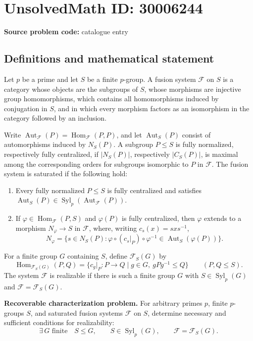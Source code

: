 \documentclass[11pt]{article}
\begin{document}
\section*{UnsolvedMath ID: 30006244}
\textbf{Source problem code:} catalogue entry
\subsection{Definitions and mathematical statement}
Let \(p\) be a prime and let \(S\) be a finite \(p\)-group. A fusion system \(\mathcal F\) on \(S\) is a category whose objects are the subgroups of \(S\), whose morphisms are injective group homomorphisms, which contains all homomorphisms induced by conjugation in \(S\), and in which every morphism factors as an isomorphism in the category followed by an inclusion.

Write \(\operatorname{Aut}_{\mathcal F}(P)=\operatorname{Hom}_{\mathcal F}(P,P)\), and let \(\operatorname{Aut}_S(P)\) consist of automorphisms induced by \(N_S(P)\). A subgroup \(P\leq S\) is fully normalized, respectively fully centralized, if \(|N_S(P)|\), respectively \(|C_S(P)|\), is maximal among the corresponding orders for subgroups isomorphic to \(P\) in \(\mathcal F\). The fusion system is saturated if the following hold:
\begin{enumerate}
\item Every fully normalized \(P\leq S\) is fully centralized and satisfies \(\operatorname{Aut}_S(P)\in\operatorname{Syl}_p(\operatorname{Aut}_{\mathcal F}(P))\).
\item If \(\varphi\in\operatorname{Hom}_{\mathcal F}(P,S)\) and \(\varphi(P)\) is fully centralized, then \(\varphi\) extends to a morphism \(N_\varphi\to S\) in \(\mathcal F\), where, writing \(c_s(x)=sxs^{-1}\),
\[
N_\varphi=\{s\in N_S(P):\varphi\circ(c_s|_P)\circ\varphi^{-1}\in\operatorname{Aut}_S(\varphi(P))\}.
\]
\end{enumerate}

For a finite group \(G\) containing \(S\), define \(\mathcal F_S(G)\) by
\[
\operatorname{Hom}_{\mathcal F_S(G)}(P,Q)
=\{c_g|_P:P\to Q\mid g\in G,\ gPg^{-1}\leq Q\}
\qquad(P,Q\leq S).
\]
The system \(\mathcal F\) is realizable if there is such a finite group \(G\) with \(S\in\operatorname{Syl}_p(G)\) and \(\mathcal F=\mathcal F_S(G)\).

\textbf{Recoverable characterization problem.} For arbitrary primes \(p\), finite \(p\)-groups \(S\), and saturated fusion systems \(\mathcal F\) on \(S\), determine necessary and sufficient conditions for realizability:
\[
\exists\,G\text{ finite}\quad
S\leq G,\qquad S\in\operatorname{Syl}_p(G),\qquad
\mathcal F=\mathcal F_S(G).
\]
\end{document}
